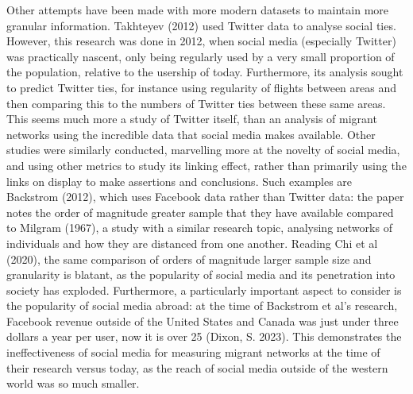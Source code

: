\documentclass[12pt]{article}
\begin{document}
Other attempts have been made with more modern datasets to maintain more granular 
information. Takhteyev (2012) used Twitter data to analyse social ties. However, this 
research was done in 2012, when social media (especially Twitter) was practically 
nascent, only being regularly used by a very small proportion of the population,
relative to the usership of today. Furthermore, its analysis sought to predict Twitter ties, 
for instance using regularity of flights between areas and then comparing this to the 
numbers of Twitter ties between these same areas. This seems much more a study 
of Twitter itself, than an analysis of migrant networks using the incredible data that 
social media makes available. Other studies were similarly conducted, marvelling more 
at the novelty of social media, and using other metrics to study its linking effect, 
rather than primarily using the links on display to make assertions and conclusions. 
Such examples are Backstrom (2012), which uses Facebook data rather than Twitter data: 
the paper notes the order of magnitude greater sample that they have available compared 
to Milgram (1967), a study with a similar research topic, analysing networks of individuals 
and how they are distanced from one another. Reading Chi et al (2020), the same comparison 
of orders of magnitude larger sample size and granularity is blatant, as the popularity 
of social media and its penetration into society has exploded. Furthermore, a particularly  
important aspect to consider is the popularity of social media abroad: at the time of Backstrom et al's 
research, Facebook revenue outside of the United States and Canada was just under three
dollars a year per user, now it is over 25 (Dixon, S. 2023). This demonstrates the
 ineffectiveness of social media for measuring migrant networks at the time of 
their research versus today, as the reach of social media outside of the western world was so much smaller.
\end{document}
